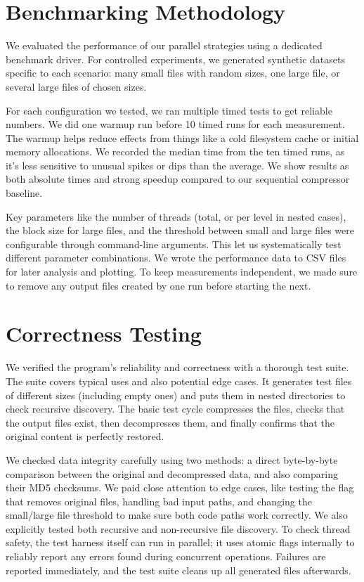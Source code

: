 \documentclass[10pt]{article}
\begin{document}
\section{Benchmarking Methodology}

We evaluated the performance of our parallel strategies using a dedicated benchmark driver. For controlled experiments, we generated synthetic datasets specific to each scenario: many small files with random sizes, one large file, or several large files of chosen sizes.

For each configuration we tested, we ran multiple timed tests to get reliable numbers. We did one warmup run before 10 timed runs for each measurement. The warmup helps reduce effects from things like a cold filesystem cache or initial memory allocations. We recorded the median time from the ten timed runs, as it's less sensitive to unusual spikes or dips than the average. We show results as both absolute times and strong speedup compared to our sequential compressor baseline.

Key parameters like the number of threads (total, or per level in nested cases), the block size for large files, and the threshold between small and large files were configurable through command-line arguments. This let us systematically test different parameter combinations. We wrote the performance data to CSV files for later analysis and plotting. To keep measurements independent, we made sure to remove any output files created by one run before starting the next.

\section{Correctness Testing}

We verified the program's reliability and correctness with a thorough test suite. The suite covers typical uses and also potential edge cases. It generates test files of different sizes (including empty ones) and puts them in nested directories to check recursive discovery. The basic test cycle compresses the files, checks that the output files exist, then decompresses them, and finally confirms that the original content is perfectly restored.

We checked data integrity carefully using two methods: a direct byte-by-byte comparison between the original and decompressed data, and also comparing their MD5 checksums. We paid close attention to edge cases, like testing the flag that removes original files, handling bad input paths, and changing the small/large file threshold to make sure both code paths work correctly. We also explicitly tested both recursive and non-recursive file discovery. To check thread safety, the test harness itself can run in parallel; it uses atomic flags internally to reliably report any errors found during concurrent operations. Failures are reported immediately, and the test suite cleans up all generated files afterwards.
\end{document}
